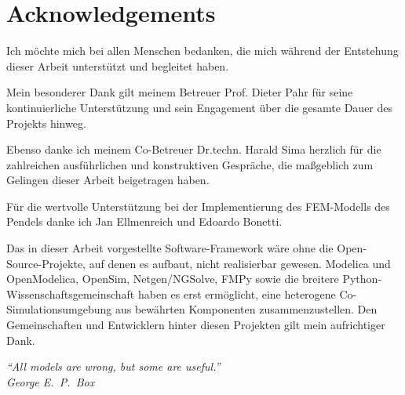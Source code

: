 \chapter*{Acknowledgements}

Ich möchte mich bei allen Menschen bedanken, die mich während der Entstehung dieser Arbeit unterstützt und begleitet haben. \newline

Mein besonderer Dank gilt meinem Betreuer Prof. Dieter Pahr für seine kontinuierliche Unterstützung und sein Engagement über die gesamte Dauer des Projekts hinweg. \newline

Ebenso danke ich meinem Co-Betreuer Dr.techn. Harald Sima herzlich für die zahlreichen ausführlichen und konstruktiven Gespräche, die maßgeblich zum Gelingen dieser Arbeit beigetragen haben. \newline

Für die wertvolle Unterstützung bei der Implementierung des FEM-Modells des Pendels danke ich Jan Ellmenreich und Edoardo Bonetti. \newline

Das in dieser Arbeit vorgestellte Software-Framework wäre ohne die Open-Source-Projekte, auf denen es aufbaut, nicht realisierbar gewesen. Modelica und OpenModelica, OpenSim, Netgen/NGSolve, FMPy sowie die breitere Python-Wissenschaftsgemeinschaft haben es erst ermöglicht, eine heterogene Co-Simulationsumgebung aus bewährten Komponenten zusammenzustellen. Den Gemeinschaften und Entwicklern hinter diesen Projekten gilt mein aufrichtiger Dank. \newline

\vfill

\begin{flushright}
\itshape
``All models are wrong, but some are useful.''\\
\normalfont George E.~P.~Box
\end{flushright}




